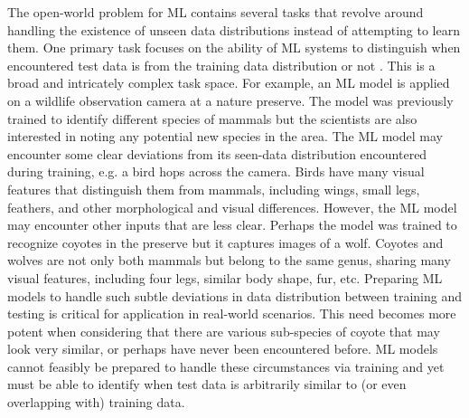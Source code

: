The open-world problem for ML contains several tasks that revolve around handling the existence of unseen data distributions instead of attempting to learn them. One primary task focuses on the ability of ML systems to distinguish when encountered test data is from the training data distribution or not \cite{yang2024generalized,sehwag2019analyzing}. This is a broad and intricately complex task space. For example, an ML model is applied on a wildlife observation camera at a nature preserve. The model was previously trained to identify different species of mammals but the scientists are also interested in noting any potential new species in the area. The ML model may encounter some clear deviations from its seen-data distribution encountered during training, e.g. a bird hops across the camera. Birds have many visual features that distinguish them from mammals, including wings, small legs, feathers, and other morphological and visual differences. However, the ML model may encounter other inputs that are less clear. Perhaps the model was trained to recognize coyotes in the preserve but it captures images of a wolf. Coyotes and wolves are not only both mammals but belong to the same genus, sharing many visual features, including four legs, similar body shape, fur, etc. Preparing ML models to handle such subtle deviations in data distribution between training and testing is critical for application in real-world scenarios. This need becomes more potent when considering that there are various sub-species of coyote that may look very similar, or perhaps have never been encountered before. ML models cannot feasibly be prepared to handle these circumstances via training and yet must be able to identify when test data is arbitrarily similar to (or even overlapping with) training data.


